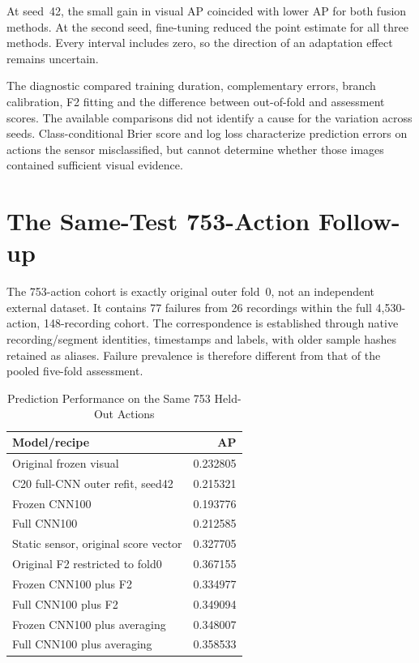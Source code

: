 At seed~42, the small gain in visual AP coincided with lower AP for both fusion methods.
At the second seed, fine-tuning reduced the point estimate for all three methods. Every
interval includes zero, so the direction of an adaptation effect remains uncertain.

The diagnostic compared training duration, complementary errors, branch calibration, F2
fitting and the difference between out-of-fold and assessment scores. The available
comparisons did not identify a cause for the variation across seeds. Class-conditional
Brier score and log loss characterize prediction errors on actions the sensor
misclassified, but cannot determine whether those images contained sufficient visual
evidence.

\section{The Same-Test 753-Action Follow-up}
The 753-action cohort is exactly original outer fold~0, not an independent external
dataset. It contains 77 failures from 26 recordings within the full 4,530-action,
148-recording cohort. The correspondence is established through native recording/segment
identities, timestamps and labels, with older sample hashes retained as aliases. Failure
prevalence is therefore different from that of the pooled five-fold assessment.

\begin{table}[htbp]
\caption{Prediction Performance on the Same 753 Held-Out Actions}\label{tab:753-supplement}
\centering\small

\begin{tabular}{lr}\hline Model/recipe&AP\\\hline
Original frozen visual&0.232805\\
C20 full-CNN outer refit, seed42&0.215321\\
Frozen CNN100&0.193776\\
Full CNN100&0.212585\\
Static sensor, original score vector&0.327705\\
Original F2 restricted to fold0&0.367155\\
Frozen CNN100 plus F2&0.334977\\
Full CNN100 plus F2&0.349094\\
Frozen CNN100 plus averaging&0.348007\\
Full CNN100 plus averaging&0.358533\\\hline
\end{tabular}
\end{table}

